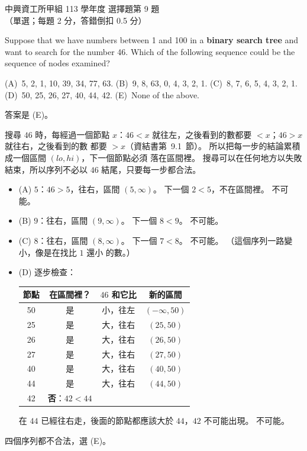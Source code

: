 \begin{pastexam}[label={px:nchu-113-dsa-09}]{中興資工所甲組 113 學年度 選擇題第 9 題}
（單選；每題 2 分，答錯倒扣 0.5 分）

Suppose that we have numbers between 1 and 100 in a \textbf{binary search tree} and want to search for the
number 46. Which of the following sequence could be the sequence of nodes examined?

(A)~5, 2, 1, 10, 39, 34, 77, 63. \qquad (B)~9, 8, 63, 0, 4, 3, 2, 1. \qquad (C)~8, 7, 6, 5, 4, 3, 2, 1.\\
(D)~50, 25, 26, 27, 40, 44, 42. \qquad (E)~None of the above.
\end{pastexam}

\begin{pastsoln}
答案是 (E)。

搜尋 $46$ 時，每經過一個節點 $x$：$46 < x$ 就往左，之後看到的數都要 $< x$；$46 > x$ 就往右，之後看到的數
都要 $> x$（資結書第~9.1~節）。 所以把每一步的結論累積成一個區間 $(\mathit{lo}, \mathit{hi})$，下一個節點必須
落在區間裡。 搜尋可以在任何地方以失敗結束，所以序列不必以 $46$ 結尾，只要每一步都合法。
\begin{itemize}
\item (A) $5$：$46 > 5$，往右，區間 $(5, \infty)$。 下一個 $2 < 5$，不在區間裡。 不可能。
\item (B) $9$：往右，區間 $(9, \infty)$。 下一個 $8 < 9$。 不可能。
\item (C) $8$：往右，區間 $(8, \infty)$。 下一個 $7 < 8$。 不可能。 （這個序列一路變小，像是在找比 $1$ 還小
的數。）
\item (D) 逐步檢查：
\begin{center}
\small
\begin{tabular}{cccc}
\toprule
節點 & 在區間裡？ & $46$ 和它比 & 新的區間 \\
\midrule
50 & 是 & 小，往左 & $(-\infty, 50)$ \\
25 & 是 & 大，往右 & $(25, 50)$ \\
26 & 是 & 大，往右 & $(26, 50)$ \\
27 & 是 & 大，往右 & $(27, 50)$ \\
40 & 是 & 大，往右 & $(40, 50)$ \\
44 & 是 & 大，往右 & $(44, 50)$ \\
42 & \textbf{否}：$42 < 44$ & & \\
\bottomrule
\end{tabular}
\end{center}
在 $44$ 已經往右走，後面的節點都應該大於 $44$，$42$ 不可能出現。 不可能。
\end{itemize}
四個序列都不合法，選 (E)。
\end{pastsoln}
